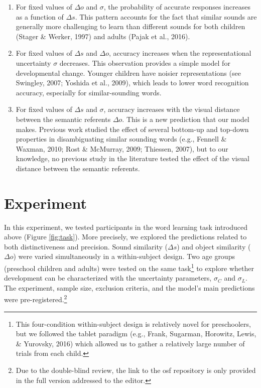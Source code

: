 \documentclass[english,,man]{apa6}
\let\rmarkdownfootnote\footnote%
\def\footnote{\protect\rmarkdownfootnote}
\theoremstyle{definition}
\theoremstyle{definition}
\theoremstyle{definition}
\theoremstyle{remark}
\begin{document}
\begin{enumerate}
\def\labelenumi{\arabic{enumi})}
\item
  For fixed values of \(\Delta o\) and \(\sigma\), the probability of
  accurate responses increases as a function of \(\Delta s\). This
  pattern accounts for the fact that similar sounds are generally more
  challenging to learn than different sounds for both children (Stager
  \& Werker, 1997) and adults (Pajak et al., 2016).
\item
  For fixed values of \(\Delta s\) and \(\Delta o\), accuracy increases
  when the representational uncertainty \(\sigma\) decreases. This
  observation provides a simple model for developmental change. Younger
  children have noisier representations (see Swingley, 2007; Yoshida et
  al., 2009), which leads to lower word recognition accuracy, especially
  for similar-sounding words.
\item
  For fixed values of \(\Delta s\) and \(\sigma\), accuracy increases
  with the visual distance between the semantic referents \(\Delta o\).
  This is a new prediction that our model makes. Previous work studied
  the effect of several bottom-up and top-down properties in
  disambiguating similar sounding words (e.g., Fennell \& Waxman, 2010;
  Rost \& McMurray, 2009; Thiessen, 2007), but to our knowledge, no
  previous study in the literature tested the effect of the visual
  distance between the semantic referents.
\end{enumerate}

\section{Experiment}\label{experiment}

In this experiment, we tested participants in the word learning task
introduced above (Figure \ref{fig:task}). More precisely, we explored
the predictions related to both distinctiveness and precision. Sound
similarity (\(\Delta s\)) and object similarity (\(\Delta o\)) were
varied simultaneously in a within-subject design. Two age groups
(preschool children and adults) were tested on the same task\footnote{This
  four-condition within-subject design is relatively novel for
  preschoolers, but we followed the tablet paradigm (e.g., Frank,
  Sugarman, Horowitz, Lewis, \& Yurovsky, 2016) which allowed us to
  gather a relatively large number of trials from each child.} to
explore whether development can be characterized with the uncertainty
parameters, \(\sigma_C\) and \(\sigma_L\). The experiment, sample size,
exclusion criteria, and the model's main predictions were
pre-registered.\footnote{Due to the double-blind review, the link to the osf repository is only provided in the full version addressed to the editor.}
\end{document}
